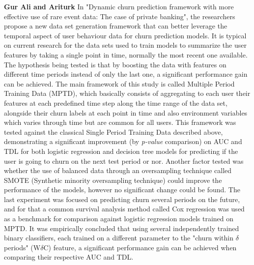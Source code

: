 \documentclass{kththesis}
\begin{document}
\textbf{Gur Ali and Ariturk} \citep{GurAli2014} In "Dynamic churn prediction framework with more effective use of rare event data: The case of private banking", the researchers propose a new data set generation framework that can better leverage the temporal aspect of user behaviour data for churn prediction models. It is typical on current research for the data sets used to train models to summarize the user features by taking a single point in time, normally the most recent one available. The hypothesis being tested is that by boosting the data with features on different time periods instead of only the last one, a significant performance gain can be achieved. The main framework of this study is called Multiple Period Training Data (MPTD), which basically consists of aggregating to each user their features at each predefined time step along the time range of the data set, alongside their churn labels at each point in time and also environment variables which varies through time but are common for all users. This framework was tested against the classical Single Period Training Data described above, demonstrating a significant improvement (by \emph{p-value} comparison) on AUC and TDL for both logistic regression and decision tree models for predicting if the user is going to churn on the next test period or nor. Another factor tested was whether the use of balanced data through an oversampling technique called SMOTE (Synthetic minority oversampling technique) could improve the performance of the models, however no significant change could be found. The last experiment was focused on predicting churn several periods on the future, and for that a common survival analysis method called Cox regression was used as a benchmark for comparison against logistic regression models trained on MPTD. It was empirically concluded that using several independently trained binary classifiers, each trained on a different parameter to the "churn within $\delta$ periods" (W$\delta$C) feature, a significant performance gain can be achieved when comparing their respective AUC and TDL.
\end{document}
